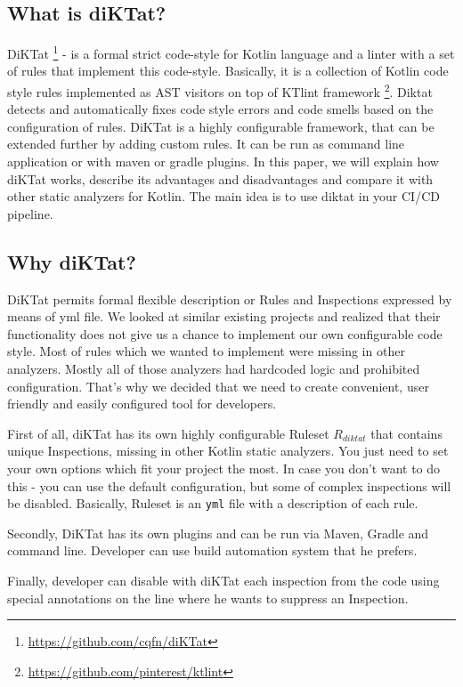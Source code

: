 \subsection{What is diKTat?}
DiKTat \footnote{\url{https://github.com/cqfn/diKTat}} - is a formal strict code-style for Kotlin language and a linter with a set of rules that implement this code-style. Basically, it is a collection of Kotlin code style rules implemented as AST visitors on top of KTlint framework \footnote{\url{https://github.com/pinterest/ktlint}}. Diktat detects and automatically fixes code style errors and code smells based on the configuration of rules. DiKTat is a highly configurable framework, that can be extended further by adding custom rules. It can be run as command line application or with maven or gradle plugins. In this paper, we will explain how diKTat works, describe its advantages and disadvantages and compare it with other static analyzers for Kotlin. The main idea is to use diktat in your CI/CD pipeline.

\subsection{Why diKTat?}
DiKTat permits formal flexible description or Rules and Inspections expressed by means of yml file. We looked at similar existing projects and realized that their functionality does not give us a chance to implement our own configurable code style. Most of rules which we wanted to implement were missing in other analyzers. Mostly all of those analyzers had hardcoded logic and prohibited configuration. That’s why we decided that we need to create convenient, user friendly and easily configured tool for developers.

First of all, diKTat has its own highly configurable Ruleset $R_{diktat}$ that contains unique Inspections, missing in other Kotlin static analyzers. You just need to set your own options which fit your project the most. In case you don't want to do this - you can use the default configuration, but some of complex inspections will be disabled. Basically, Ruleset is an \texttt{yml} file with a description of each rule.

Secondly, DiKTat has its own plugins and can be run via Maven, Gradle and command line. Developer can use build automation system that he prefers.

Finally, developer can disable with diKTat each inspection from the code using special annotations on the line where he wants to suppress an Inspection.